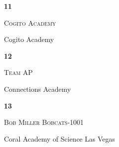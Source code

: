 \documentclass[extrafontsizes,30pt]{memoir}
\begin{document}
\renewcommand{\TeamID}{11}
\renewcommand{\TeamName}{Cogito Academy}
\renewcommand{\SchoolName}{Cogito Academy}

\begin{center}
\mbox{}
\vspace{1in}

{\Huge \textbf{ \TeamID}}

\vspace{1in}

{\Large \textsc{\TeamName}}

\vspace{1in}

{\large \SchoolName}
\end{center}

\newpage



\renewcommand{\TeamID}{12}
\renewcommand{\TeamName}{Team AP}
\renewcommand{\SchoolName}{Connections Academy}

\begin{center}
\mbox{}
\vspace{1in}

{\Huge \textbf{ \TeamID}}

\vspace{1in}

{\Large \textsc{\TeamName}}

\vspace{1in}

{\large \SchoolName}
\end{center}

\newpage



\renewcommand{\TeamID}{13}
\renewcommand{\TeamName}{Bob Miller Bobcats-1001}
\renewcommand{\SchoolName}{Coral Academy of Science Las Vegas}

\begin{center}
\mbox{}
\vspace{1in}

{\Huge \textbf{ \TeamID}}

\vspace{1in}

{\Large \textsc{\TeamName}}

\vspace{1in}

{\large \SchoolName}
\end{center}

\newpage



\renewcommand{\TeamID}{14}
\renewcommand{\TeamName}{Coral Falcons-1001}
\renewcommand{\SchoolName}{Coral Academy of Science Las Vegas}
\end{document}
